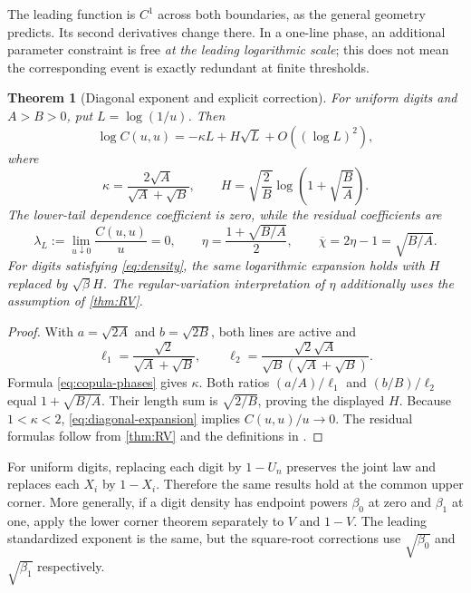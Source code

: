 \documentclass[11pt,a4paper]{article}
\newtheorem{theorem}{Theorem}[section]
\theoremstyle{definition}
\theoremstyle{remark}
\numberwithin{equation}{section}
\begin{document}
The leading function is $C^1$ across both boundaries, as the general
geometry predicts. Its second derivatives change there. In a one-line
phase, an additional parameter constraint is free \emph{at the leading
logarithmic scale}; this does not mean the corresponding event is exactly
redundant at finite thresholds.

\begin{theorem}[Diagonal exponent and explicit correction]
\label{thm:diagonal}
For uniform digits and $A>B>0$, put $L=\log(1/u)$. Then
\begin{equation}
 \log C(u,u)=-\kappa L+H\sqrt L+O((\log L)^2),
 \label{eq:diagonal-expansion}
\end{equation}
where
\begin{equation}
 \boxed{\quad
 \kappa=\frac{2\sqrt A}{\sqrt A+\sqrt B},\qquad
 H=\sqrt{\frac2B}\log\left(1+\sqrt{\frac BA}\right).
 \quad}
 \label{eq:diagonal-kH}
\end{equation}
The lower-tail dependence coefficient is zero, while the residual
coefficients are
\begin{equation}
 \lambda_L:=\lim_{u\downarrow0}\frac{C(u,u)}u=0,\qquad
 \eta=\frac{1+\sqrt{B/A}}2,\qquad
 \overline\chi=2\eta-1=\sqrt{B/A}.
 \label{eq:residual}
\end{equation}
For digits satisfying \eqref{eq:density}, the same logarithmic expansion
holds with $H$ replaced by $\sqrt\beta H$. The regular-variation
interpretation of $\eta$ additionally uses the assumption of
\cref{thm:RV}.
\end{theorem}
\begin{proof}
With $a=\sqrt{2A}$ and $b=\sqrt{2B}$, both lines are active and
\[
 \ell_1=\frac{\sqrt2}{\sqrt A+\sqrt B},\qquad
 \ell_2=\frac{\sqrt2\sqrt A}{\sqrt B(\sqrt A+\sqrt B)}.
\]
Formula \eqref{eq:copula-phases} gives $\kappa$. Both ratios
$(a/A)/\ell_1$ and $(b/B)/\ell_2$ equal $1+\sqrt{B/A}$.
Their length sum is $\sqrt{2/B}$, proving the displayed $H$.
Because $1<\kappa<2$, \eqref{eq:diagonal-expansion} implies
$C(u,u)/u\to0$. The residual formulas follow from \cref{thm:RV} and
the definitions in \cite{LedfordTawn,Tankov}.
\end{proof}

For uniform digits, replacing each digit by $1-U_n$ preserves the joint
law and replaces each $X_i$ by $1-X_i$. Therefore the same results hold
at the common upper corner. More generally, if a digit density has
endpoint powers $\beta_0$ at zero and $\beta_1$ at one, apply the lower
corner theorem separately to $V$ and $1-V$. The leading standardized
exponent is the same, but the square-root corrections use
$\sqrt{\beta_0}$ and $\sqrt{\beta_1}$ respectively.
\end{document}
